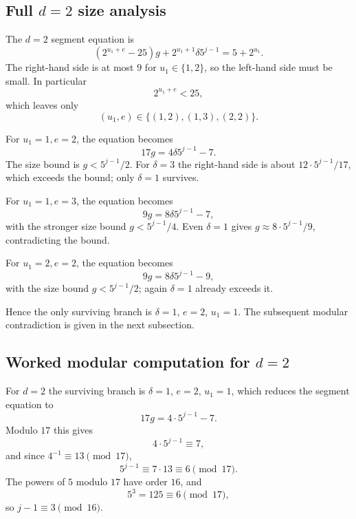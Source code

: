 \subsection{Full $d=2$ size analysis}

The $d=2$ segment equation is
\begin{equation*}
  \left(2^{u_1+e}-25\right)g
    +2^{u_1+1}\delta5^{j-1}=5+2^{u_1}.
\end{equation*}
The right-hand side is at most $9$ for $u_1\in\{1,2\}$, so the left-hand
side must be small.  In particular
\begin{equation*}
  2^{u_1+e}<25,
\end{equation*}
which leaves only
\begin{equation*}
  (u_1,e)\in\{(1,2),(1,3),(2,2)\}.
\end{equation*}

For $u_1=1,e=2$, the equation becomes
\begin{equation*}
  17g=4\delta5^{j-1}-7.
\end{equation*}
The size bound is $g<5^{j-1}/2$.  For $\delta=3$ the right-hand side
is about $12\cdot5^{j-1}/17$, which exceeds the bound; only
$\delta=1$ survives.

For $u_1=1,e=3$, the equation becomes
\begin{equation*}
  9g=8\delta5^{j-1}-7,
\end{equation*}
with the stronger size bound $g<5^{j-1}/4$.  Even $\delta=1$ gives
$g\approx8\cdot5^{j-1}/9$, contradicting the bound.

For $u_1=2,e=2$, the equation becomes
\begin{equation*}
  9g=8\delta5^{j-1}-9,
\end{equation*}
with the size bound $g<5^{j-1}/2$; again $\delta=1$ already exceeds it.

Hence the only surviving branch is $\delta=1$, $e=2$, $u_1=1$.  The
subsequent modular contradiction is given in the next subsection.

\subsection{Worked modular computation for $d=2$}

For $d=2$ the surviving branch is $\delta=1$, $e=2$, $u_1=1$, which
reduces the segment equation to
\begin{equation*}
  17g=4\cdot5^{j-1}-7.
\end{equation*}
Modulo $17$ this gives
\begin{equation*}
  4\cdot5^{j-1}\equiv7,
\end{equation*}
and since $4^{-1}\equiv13\pmod{17}$,
\begin{equation*}
  5^{j-1}\equiv7\cdot13\equiv6\pmod{17}.
\end{equation*}
The powers of $5$ modulo $17$ have order $16$, and
\begin{equation*}
  5^3=125\equiv6\pmod{17},
\end{equation*}
so $j-1\equiv3\pmod{16}$.

